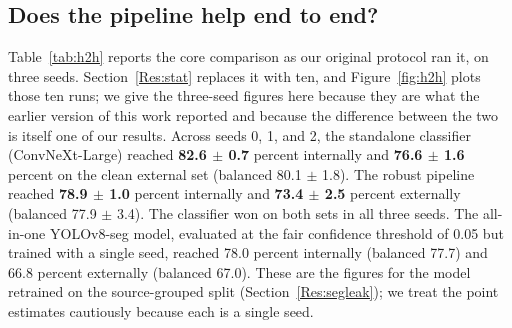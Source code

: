 \documentclass{melba}
\begin{document}
\subsection{Does the pipeline help end to end?}
\label{Res:h2h}
Table~\ref{tab:h2h} reports the core comparison as our original protocol ran it, on three seeds. Section~\ref{Res:stat} replaces it with ten, and Figure~\ref{fig:h2h} plots those ten runs; we give the three-seed figures here because they are what the earlier version of this work reported and because the difference between the two is itself one of our results. Across seeds 0, 1, and 2, the standalone classifier (ConvNeXt-Large) reached \textbf{82.6 $\pm$ 0.7} percent internally and \textbf{76.6 $\pm$ 1.6} percent on the clean external set (balanced 80.1 $\pm$ 1.8). The robust pipeline reached \textbf{78.9 $\pm$ 1.0} percent internally and \textbf{73.4 $\pm$ 2.5} percent externally (balanced 77.9 $\pm$ 3.4). The classifier won on both sets in all three seeds. The all-in-one YOLOv8-seg model, evaluated at the fair confidence threshold of 0.05 but trained with a single seed, reached 78.0 percent internally (balanced 77.7) and 66.8 percent externally (balanced 67.0). These are the figures for the model retrained on the source-grouped split (Section~\ref{Res:segleak}); we treat the point estimates cautiously because each is a single seed.
\end{document}
